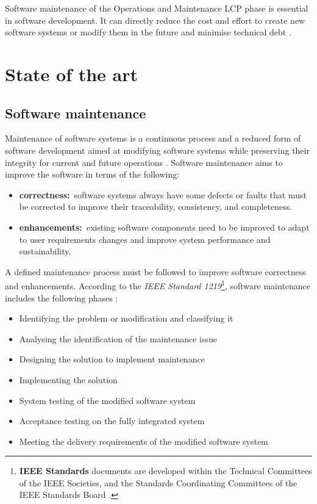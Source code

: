 Software maintenance of the Operations and Maintenance LCP phase is essential in software development. It can directly reduce the cost and effort to create new software systems or modify them in the future and minimise technical debt \cite{Thamburaj2017, DeLeon-Sigg2020}.

\clearpage

\section{State of the art}

\subsection{Software maintenance}\label{sec:ch1_softwareMaintenanceIntro}{}
Maintenance of software systems is a continuous process and a reduced form of software development aimed at modifying software systems while preserving their integrity for current and future operations \cite{Sneed2004, Ackermann2009, Port2017}. Software maintenance aims to improve the software in terms of the following:

\begin{itemize}
	\item \textbf{correctness:}~software systems always have some defects or faults that must be corrected to improve their traceability, consistency, and completeness.
	\item \textbf{enhancements:}\RaggedRight~existing software components need to be improved to adapt to user requirements changes and improve system performance and sustainability.
\end{itemize}

A defined maintenance process must be followed to improve software correctness and enhancements. According to the \textit{IEEE Standard 1219}\footnote{\textbf{IEEE Standards} documents are developed within the Technical Committees of the IEEE Societies, and the Standards Coordinating Committees of the IEEE Standards Board \cite{Mamone1994}.}, software maintenance includes the following phases \cite{Mamone1994, Hasan2012, Stojanov2017}:

\begin{itemize}
	\item Identifying the problem or modification and classifying it
	\item Analysing the identification of the maintenance issue
	\item Designing the solution to implement maintenance
	\item Implementing the solution
	\item System testing of the modified software system
	\item Acceptance testing on the fully integrated system
	\item Meeting the delivery requirements of the modified software system
\end{itemize}

